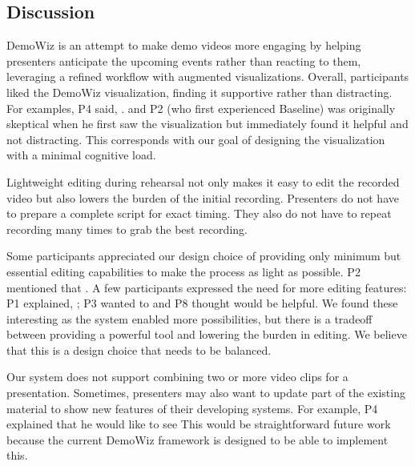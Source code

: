 \subsection{Discussion}

DemoWiz is an attempt to make demo videos more engaging by helping presenters anticipate the upcoming events rather than reacting to them, leveraging a refined workflow with augmented visualizations. Overall, participants liked the DemoWiz visualization, finding it supportive rather than distracting. For examples, P4 said, . and P2 (who first experienced Baseline) was originally skeptical when he first saw the visualization but immediately found it helpful and not distracting. This corresponds with our goal of designing the visualization with a minimal cognitive load.

Lightweight editing during rehearsal not only makes it easy to edit the recorded video but also lowers the burden of the initial recording. Presenters do not have to prepare a complete script for exact timing. They also do not have to repeat recording many times to grab the best recording.

Some participants appreciated our design choice of providing only minimum but essential editing capabilities to make the process as light as possible. P2 mentioned that . A few participants expressed the need for more editing features: P1 explained, ; P3 wanted to  and P8 thought  would be helpful. We found these interesting as the system enabled more possibilities, but there is a tradeoff between providing a powerful tool and lowering the burden in editing. We believe that this is a design choice that needs to be balanced.

Our system does not support combining two or more video clips for a presentation. Sometimes, presenters may also want to update part of the existing material to show new features of their developing systems. For example, P4 explained that he would like to see  This would be straightforward future work because the current DemoWiz framework is designed to be able to implement this.

